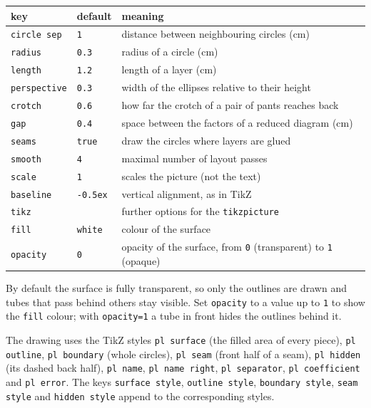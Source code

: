 \documentclass[11pt]{article}
\newcommand\opt[1]{\texttt{#1}}
\begin{document}
\begin{center}
\begin{tabular}{@{}lll@{}}
  \toprule
  key & default & meaning \\
  \midrule
  \opt{circle sep}  & \opt{1}     & distance between neighbouring circles (cm) \\
  \opt{radius}      & \opt{0.3}   & radius of a circle (cm) \\
  \opt{length}      & \opt{1.2}   & length of a layer (cm) \\
  \opt{perspective} & \opt{0.3}   & width of the ellipses relative to their height \\
  \opt{crotch}      & \opt{0.6}   & how far the crotch of a pair of pants reaches back \\
  \opt{gap}         & \opt{0.4}   & space between the factors of a reduced diagram (cm) \\
  \opt{seams}       & \opt{true}  & draw the circles where layers are glued \\
  \opt{smooth}      & \opt{4}     & maximal number of layout passes \\
  \opt{scale}       & \opt{1}     & scales the picture (not the text) \\
  \opt{baseline}    & \opt{-0.5ex}& vertical alignment, as in TikZ \\
  \opt{tikz}        &             & further options for the \texttt{tikzpicture} \\
  \opt{fill}        & \opt{white} & colour of the surface \\
  \opt{opacity}     & \opt{0}     & opacity of the surface, from \opt{0} (transparent) to \opt{1} (opaque) \\
  \bottomrule
\end{tabular}
\end{center}

By default the surface is fully transparent, so only the outlines are drawn
and tubes that pass behind others stay visible. Set \opt{opacity} to a value
up to \opt{1} to show the \opt{fill} colour; with \opt{opacity=1} a tube in
front hides the outlines behind it.

The drawing uses the TikZ styles \opt{pl surface} (the filled area of every
piece), \opt{pl outline}, \opt{pl boundary} (whole circles), \opt{pl seam}
(front half of a seam), \opt{pl hidden} (its dashed back half), \opt{pl name},
\opt{pl name right}, \opt{pl separator}, \opt{pl coefficient} and
\opt{pl error}. The keys \opt{surface style}, \opt{outline style},
\opt{boundary style}, \opt{seam style} and \opt{hidden style} append to the
corresponding styles.
\end{document}

